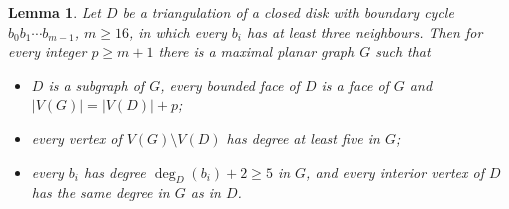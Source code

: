 \documentclass[10pt,a4paper]{article}
\newtheorem{lemma}[theorem]{Lemma}
\begin{document}


\begin{lemma}
\label{Lemma_closure}Let $D$ be a triangulation of a closed disk with boundary cycle $b_{0}b_{1}\cdots b_{m-1}$,
$m\geq 16$, in which every $b_{i}$ has at least three neighbours. Then for every integer $p\geq m+1$ there is a
maximal planar graph $G$ such that

\begin{itemize}
\item[\textrm{(i)}] $D$ is a subgraph of $G$, every bounded face of $D$ is a face of $G$ and $|V(G)|=|V(D)|+p$;
\item[\textrm{(ii)}] every vertex of $V(G)\setminus V(D)$ has degree at least five in $G$;
\item[\textrm{(iii)}] every $b_{i}$ has degree $\deg_{D}(b_{i})+2\geq 5$ in $G$, and every interior vertex of $D$
has the same degree in $G$ as in $D$.
\end{itemize}
\end{lemma}
\end{document}
